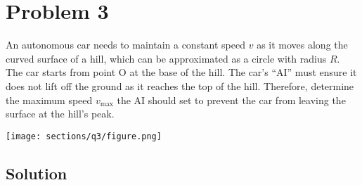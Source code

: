 \section*{Problem 3}

An autonomous car needs to maintain a constant speed \( v \) as it moves along the curved surface of a hill, which can be approximated as a circle with radius \( R \).
The car starts from point O at the base of the hill.
The car's ``AI'' must ensure it does not lift off the ground as it reaches the top of the hill.
Therefore, determine the maximum speed \( v_{\max} \) the AI should set to prevent the car from leaving the surface at the hill's peak.

\begin{figure*}[h]
    \centering
    \texttt{[image: sections/q3/figure.png]}
\end{figure*}

\subsection*{Solution}
